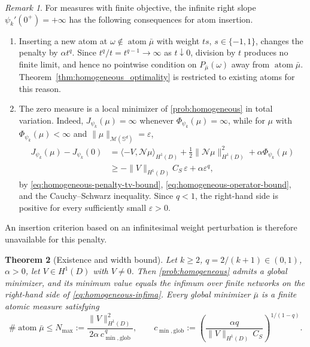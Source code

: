 \documentclass[11pt]{amsart}
\newtheorem{theorem}{Theorem}[section]
\theoremstyle{definition}
\theoremstyle{remark}
\newtheorem{remark}[theorem]{Remark}
\DeclareMathOperator{\atom}{atom}
\begin{document}
\begin{remark}
\label{rem:homogeneous_singular_slope}
For measures with finite objective, the infinite right slope
$\psi_k'(0^+)=+\infty$ has the following consequences for atom insertion.
\begin{enumerate}
	\item Inserting a new atom at $\omega\notin\atom\bar\mu$ with weight
	$ts$, $s\in\{-1,1\}$, changes the penalty by $\alpha t^q$. Since
	$t^q/t=t^{q-1}\to\infty$ as $t\downarrow0$, division by $t$ produces no
	finite limit, and hence no pointwise condition on $P_{\bar\mu}(\omega)$ away
	from $\atom\bar\mu$. Theorem~\ref{thm:homogeneous_optimality} is
	restricted to existing atoms for this reason.
	\item The zero measure is a local minimizer of \eqref{prob:homogeneous} in
	total variation. Indeed, $J_{\psi_k}(\mu)=\infty$ whenever
	$\Phi_{\psi_k}(\mu)=\infty$, while for $\mu$ with
	$\Phi_{\psi_k}(\mu)<\infty$ and
	$\|\mu\|_{\mathcal M(\mathbb S^d)}=\varepsilon$,
	\begin{align*}
		J_{\psi_k}(\mu)-J_{\psi_k}(0)
		&=\langle-V,\mathcal N\mu\rangle_{H^1(D)}
		+\tfrac12\|\mathcal N\mu\|^2_{H^1(D)}
		+\alpha\Phi_{\psi_k}(\mu)\\
		&\ge-\|V\|_{H^1(D)}C_S\,\varepsilon+\alpha\varepsilon^q,
	\end{align*}
	by \eqref{eq:homogeneous-penalty-tv-bound},
	\eqref{eq:homogeneous-operator-bound}, and the Cauchy--Schwarz inequality.
	Since $q<1$, the right-hand side is positive for every
	sufficiently small $\varepsilon>0$.
\end{enumerate}
An insertion criterion based on an infinitesimal weight perturbation is therefore
unavailable for this penalty.
\end{remark}



\begin{theorem}[Existence and width bound]
\label{thm:homogeneous_existence}
Let $k\ge2$, $q=2/(k+1)\in(0,1)$, $\alpha>0$, let $V\in H^1(D)$ with
$V\ne0$. Then
\eqref{prob:homogeneous} admits a global minimizer, and its minimum value
equals the infimum over finite networks on the right-hand side of
\eqref{eq:homogeneous-infima}. Every global minimizer $\bar\mu$ is a finite
atomic measure satisfying
\begin{equation*}
	\#\atom\bar\mu\le N_{\max}:=
	\frac{\|V\|^2_{H^1(D)}}{2\alpha\,c_{\min,\mathrm{glob}}^{\,q}},
	\qquad
	c_{\min,\mathrm{glob}}:=
	\left(
		\frac{\alpha q}{\|V\|_{H^1(D)}\,C_S}
	\right)^{1/(1-q)}.
\end{equation*}
\end{theorem}
\end{document}
